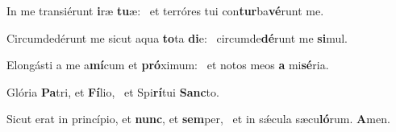 \item In me transiérunt \textbf{i}ræ \textbf{tu}æ:~\psstar{} et terróres tui con\textbf{tur}ba\textbf{vé}runt me.
\item Circumdedérunt me sicut aqua \textbf{to}ta \textbf{di}e:~\psstar{} circumde\textbf{dé}runt me \textbf{si}mul.
\item Elongásti a me a\textbf{mí}cum et \textbf{pró}ximum:~\psstar{} et notos meos \textbf{a} mi\textbf{sé}ria.
\item Glória \textbf{Pa}tri, et \textbf{Fí}lio,~\psstar{} et Spi\textbf{rí}tui \textbf{Sanc}to.
\item Sicut erat in princípio, et \textbf{nunc}, et \textbf{sem}per,~\psstar{} et in sǽcula sæcu\textbf{ló}rum. \textbf{A}men.
